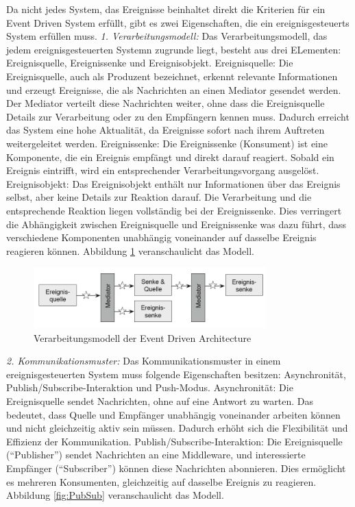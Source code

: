 \documentclass[a4paper,12pt]{article}
\begin{document}
Da nicht jedes System, das Ereignisse beinhaltet direkt die Kriterien für ein Event Driven System erfüllt, gibt es zwei Eigenschaften, die ein ereignisgesteuerts System erfüllen muss. \newline
\textit{1. Verarbeitungsmodell:} \newline
Das Verarbeitungsmodell, das jedem ereignisgesteuerten Systemn zugrunde liegt, besteht aus drei ELementen: Ereignisquelle, Ereignissenke und Ereignisobjekt.
Ereignisquelle: Die Ereignisquelle, auch als Produzent bezeichnet, erkennt relevante Informationen und erzeugt Ereignisse, die als Nachrichten an einen Mediator gesendet werden. Der Mediator verteilt diese Nachrichten weiter, ohne dass die Ereignisquelle Details zur Verarbeitung oder zu den Empfängern kennen muss. Dadurch erreicht das System eine hohe Aktualität, da Ereignisse sofort nach ihrem Auftreten weitergeleitet werden.
Ereignissenke: Die Ereignissenke (Konsument) ist eine Komponente, die ein Ereignis empfängt und direkt darauf reagiert. Sobald ein Ereignis eintrifft, wird ein entsprechender Verarbeitungsvorgang ausgelöst.
Ereignisobjekt: Das Ereignisobjekt enthält nur Informationen über das Ereignis selbst, aber keine Details zur Reaktion darauf. Die Verarbeitung und die entsprechende Reaktion liegen vollständig bei der Ereignissenke. Dies verringert die Abhängigkeit zwischen Ereignisquelle und Ereignissenke was dazu führt, dass verschiedene Komponenten unabhängig voneinander auf dasselbe Ereignis reagieren können. \cite[S. 51f]{Bruns2010} \newline
Abbildung \ref{fig:Verarbeitungsmodell} veranschaulicht das Modell. 

\begin{figure}[h]
    \centering
    \includegraphics[width=0.8\textwidth]{images/Verarbeitungsmodell.png}
    \caption{Verarbeitungsmodell der Event Driven Architecture \cite[S. 52]{Bruns2010}}
    \label{fig:Verarbeitungsmodell}
\end{figure}

\textit{2. Kommunikationsmuster:} \newline
Das Kommunikationsmuster in einem ereignisgesteuerten System muss folgende Eigenschaften besitzen: Asynchronität, Publish/Subscribe-Interaktion und Push-Modus.
Asynchronität: Die Ereignisquelle sendet Nachrichten, ohne auf eine Antwort zu warten. Das bedeutet, dass Quelle und Empfänger unabhängig voneinander arbeiten können und nicht gleichzeitig aktiv sein müssen. Dadurch erhöht sich die Flexibilität und Effizienz der Kommunikation.
Publish/Subscribe-Interaktion: Die Ereignisquelle (“Publisher”) sendet Nachrichten an eine Middleware, und interessierte Empfänger (“Subscriber”) können diese Nachrichten abonnieren. Dies ermöglicht es mehreren Konsumenten, gleichzeitig auf dasselbe Ereignis zu reagieren.
Abbildung \ref{fig:PubSub} veranschaulicht das Modell.
\end{document}

